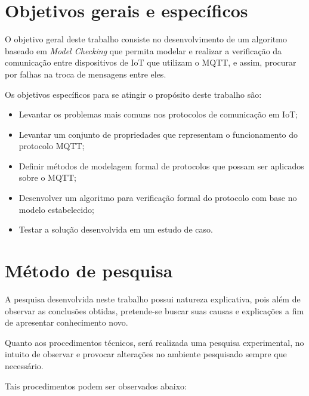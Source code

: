 \section{Objetivos gerais e específicos}

O objetivo geral deste trabalho consiste no desenvolvimento de um algoritmo baseado em \textit{Model Checking} que permita modelar e realizar a verificação da comunicação entre dispositivos de IoT que utilizam o MQTT, e assim, procurar por falhas na troca de mensagens entre eles.

Os objetivos específicos para se atingir o propósito deste trabalho são:

\begin{itemize}
    \item Levantar os problemas mais comuns nos protocolos de comunicação em IoT;
	\item Levantar um conjunto de propriedades que representam o funcionamento do protocolo MQTT;
	\item Definir métodos de modelagem formal de protocolos que possam ser aplicados sobre o MQTT;
	\item Desenvolver um algoritmo para verificação formal do protocolo com base no modelo estabelecido;
	\item Testar a solução desenvolvida em um estudo de caso.
\end{itemize}

\section{Método de pesquisa}

A pesquisa desenvolvida neste trabalho possui natureza explicativa, pois além de observar as conclusões obtidas, pretende-se buscar suas causas e explicações a fim de apresentar conhecimento novo.

Quanto aos procedimentos técnicos, será realizada uma pesquisa experimental, no intuito de observar e provocar alterações no ambiente pesquisado sempre que necessário.

Tais procedimentos podem ser observados abaixo:

